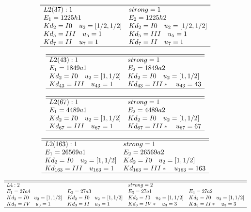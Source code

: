 \documentclass[11pt]{article}
\theoremstyle{definition}
\begin{document}
$$
 \begin{array}{ll}
 \hline 
\hline 
  L2(37):1  & strong=1\\
 E_1=1225h1 & E_2=1225h2 \\
  Kd_{2}=I0\quad u_{2}=[ 1/2, 1/2 ]&  Kd_{2}=I0\quad u_{2}=[ 1/2, 1/2 ]\\
  Kd_{5}=III\quad u_{5}=1&  Kd_{5}=III\quad u_{5}=1\\
  Kd_{7}=II\quad u_{7}=1&  Kd_{7}=II\quad u_{7}=1\\
\hline
\end{array}
 $$


$$
 \begin{array}{ll}
 \hline 
\hline 
  L2(43):1  & strong=1\\
 E_1=1849a1 & E_2=1849a2 \\
  Kd_{2}=I0\quad u_{2}=[ 1, 1/2 ]&  Kd_{2}=I0\quad u_{2}=[ 1, 1/2 ]\\
  Kd_{43}=III\quad u_{43}=1&  Kd_{43}=III*\quad u_{43}=43\\
\hline
\end{array}
 $$


$$
 \begin{array}{ll}
 \hline 
\hline 
  L2(67):1  & strong=1\\
 E_1=4489a1 & E_2=4489a2 \\
  Kd_{2}=I0\quad u_{2}=[ 1, 1/2 ]&  Kd_{2}=I0\quad u_{2}=[ 1, 1/2 ]\\
  Kd_{67}=III\quad u_{67}=1&  Kd_{67}=III*\quad u_{67}=67\\
\hline
\end{array}
 $$


$$
 \begin{array}{ll}
 \hline 
\hline 
  L2(163):1  & strong=1\\
 E_1=26569a1 & E_2=26569a2 \\
  Kd_{2}=I0\quad u_{2}=[ 1, 1/2 ]&  Kd_{2}=I0\quad u_{2}=[ 1, 1/2 ]\\
  Kd_{163}=III\quad u_{163}=1&  Kd_{163}=III*\quad u_{163}=163\\
\hline
\end{array}
 $$


$$
 \begin{array}{llll}
 \hline 
\hline 
  L4:2  &   & strong=2\\
 E_1=27a4 & E_2=27a3 & E_3=27a1 & E_4=27a2 \\
  Kd_{2}=I0\quad u_{2}=[ 1, 1/2 ]&  Kd_{2}=I0\quad u_{2}=[ 1, 1/2 ]&  Kd_{2}=I0\quad u_{2}=[ 1, 1/2 ]&  Kd_{2}=I0\quad u_{2}=[ 1, 1/2 ]\\
  Kd_{3}=IV\quad u_{3}=1&  Kd_{3}=II\quad u_{3}=1&  Kd_{3}=IV*\quad u_{3}=3&  Kd_{3}=II*\quad u_{3}=3\\
\hline
\end{array}
 $$
\end{document}
